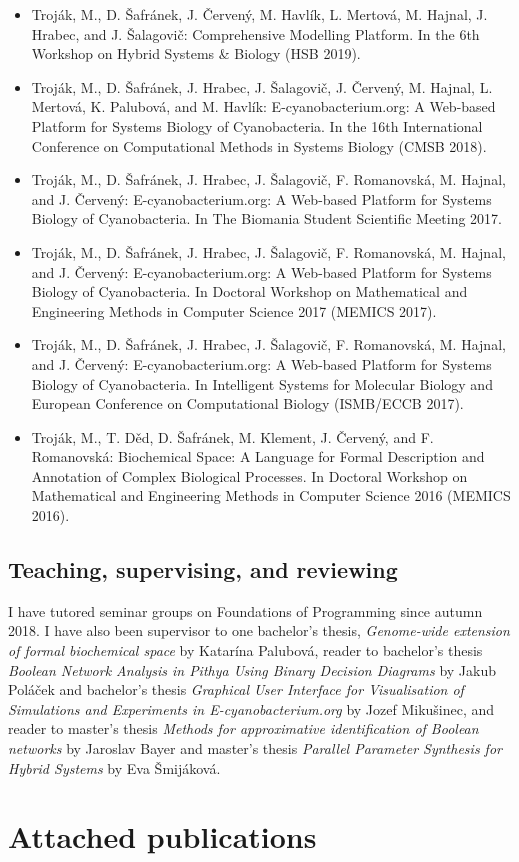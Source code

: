 \documentclass[11pt,a4paper]{report}
\begin{document}
\begin{itemize}
	\item Troják, M., D. Šafránek, J. Červený, M. Havlík, L. Mertová, M. Hajnal, J. Hrabec, and J. Šalagovič: Comprehensive Modelling Platform. In the 6th Workshop on Hybrid Systems \& Biology (HSB 2019).
	\item Troják, M., D. Šafránek, J. Hrabec, J. Šalagovič, J. Červený, M. Hajnal, L. Mertová, K. Palubová, and M. Havlík: E-cyanobacterium.org: A Web-based Platform for Systems Biology of Cyanobacteria. In the 16th International Conference on Computational Methods in Systems Biology (CMSB 2018).
	\item Troják, M., D. Šafránek, J. Hrabec, J. Šalagovič, F. Romanovská, M. Hajnal, and J. Červený: E-cyanobacterium.org: A Web-based Platform for Systems Biology of Cyanobacteria. In The Biomania Student Scientific Meeting 2017.
	\item Troják, M., D. Šafránek, J. Hrabec, J. Šalagovič, F. Romanovská, M. Hajnal, and J. Červený: E-cyanobacterium.org: A Web-based Platform for Systems Biology of Cyanobacteria. In Doctoral Workshop on Mathematical and Engineering Methods in Computer Science 2017 (MEMICS 2017).
	\item Troják, M., D. Šafránek, J. Hrabec, J. Šalagovič, F. Romanovská, M. Hajnal, and J. Červený: E-cyanobacterium.org: A Web-based Platform for Systems Biology of Cyanobacteria. In Intelligent Systems for Molecular Biology and European Conference on Computational Biology (ISMB/ECCB 2017).
	\item Troják, M., T. Děd, D. Šafránek, M. Klement, J. Červený, and F. Romanovská: Biochemical Space: A Language for Formal Description and Annotation of Complex Biological Processes. In Doctoral Workshop on Mathematical and Engineering Methods in Computer Science 2016 (MEMICS 2016).
\end{itemize}

\section{Teaching, supervising, and reviewing}

I have tutored seminar groups on Foundations of Programming since autumn 2018. I have also been supervisor to one bachelor's thesis, \emph{Genome-wide extension of formal biochemical space} by Katarína Palubová, reader to bachelor's thesis \emph{Boolean Network Analysis in Pithya Using Binary Decision Diagrams} by Jakub Poláček and bachelor's thesis \emph{Graphical User Interface for Visualisation of Simulations and Experiments in E-cyanobacterium.org} by Jozef Mikušinec, and reader to master's thesis \emph{Methods for approximative identification of Boolean networks} by Jaroslav Bayer and master's thesis \emph{Parallel Parameter Synthesis for Hybrid Systems} by Eva Šmijáková.

\chapter{Attached publications}




\end{document}
